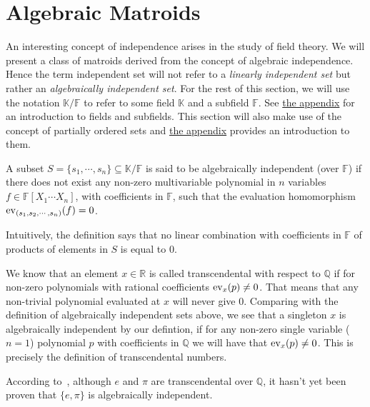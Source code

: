 \newpage

\section{Algebraic Matroids}\label{sec:algebraic-matroids}

An interesting concept of independence arises in the study of field theory.  We will present a class of matroids derived from the concept of algebraic independence. Hence the term independent set will not refer to a \textit{linearly independent set} but rather an \textit{algebraically independent set}. For the rest of this section, we will use the notation $\mathbb K / \mathbb F$ to refer to some field $\mathbb K$ and a subfield $\mathbb F$. See \hyperref[sec:appendix-fields]{the appendix} for an introduction to fields and subfields. This section will also make use of the concept of partially ordered sets and  \hyperref[sec:appendix-poset]{the appendix} provides an introduction to them.

\begin{defn}
	A subset $S = \{ s_1 ,\cdots, s _n \} \subseteq \mathbb K / \mathbb F$ is said to be algebraically independent (over $\mathbb F$) if there does not exist any
	non-zero multivariable polynomial in $n$ variables $f \in \mathbb{F}[X _1 \cdots X _n]$, with coefficients in $\mathbb{F} $, such that the evaluation homomorphism $\mathrm{ev}_{(s_1, s_2,\cdots,s_n)}(f) = 0$.
\end{defn}
Intuitively, the definition says that no linear combination with coefficients in $\mathbb F$ of products of elements in $S$ is equal to $0$.

We know that an element $x\in \mathbb{R}$ is called transcendental with respect to $\mathbb{Q}$ if for non-zero polynomials with rational coefficients $\mathrm{ev}_{x}(p) \neq 0$. That means that any non-trivial polynomial evaluated at $x$ will never give 0.
Comparing with the definition of algebraically independent sets above, we see that a singleton ${x}$ is algebraically independent by our defintion, if for any non-zero  single variable ($n = 1$) polynomial $p$ with coefficients in $\mathbb{Q}$ we will have that $\mathrm{ev}_{x}(p) \neq 0$. This is precisely the definition of transcendental numbers.

\begin{exmp}
According to~\cite[113]{milne2022}, although $e$ and $\pi$ are transcendental over $\mathbb{Q}$, it hasn't yet been proven that $\{e, \pi \}$ is algebraically independent.
\end{exmp}


